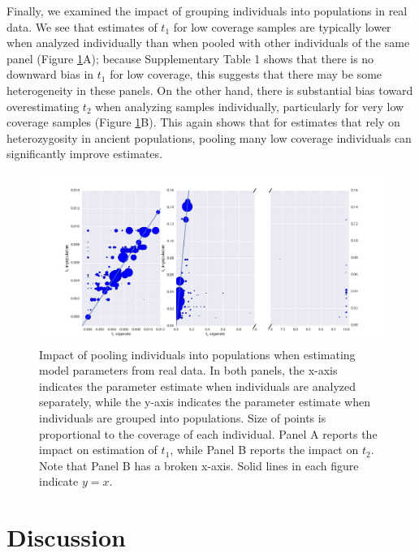 \documentclass[11pt, oneside]{article}   	%
\begin{document}
Finally, we examined the impact of grouping individuals into populations in real data.  We see that estimates of $t_1$ for low coverage samples are typically lower when analyzed individually than when pooled with other individuals of the same panel (Figure \ref{sep_vs_pops}A); because Supplementary Table 1 shows that there is no downward bias in $t_1$ for low coverage, this suggests that there may be some heterogeneity in these panels. On the other hand, there is substantial bias toward overestimating $t_2$ when analyzing samples individually, particularly for very low coverage samples (Figure \ref{sep_vs_pops}B). This again shows that for estimates that rely on heterozygosity in ancient populations, pooling many low coverage individuals can significantly improve estimates.

\begin{figure}[h] %
   \centering
   \includegraphics[width=\textwidth]{sep_vs_pops.pdf} 
   \caption{Impact of pooling individuals into populations when estimating model parameters from real data. In both panels, the x-axis indicates the parameter estimate when individuals are analyzed separately, while the y-axis indicates the parameter estimate when individuals are grouped into populations. Size of points is proportional to the coverage of each individual. Panel A reports the impact on estimation of $t_1$, while Panel B reports the impact on $t_2$. Note that Panel B has a broken x-axis. Solid lines in each figure indicate $y = x$.}
   \label{sep_vs_pops}
\end{figure}

\section{Discussion}
\end{document}
